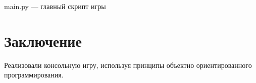 \begin{code}
	\inputminted[breaklines=true, xleftmargin=1em, linenos, frame=single, framesep=10pt, fontsize=\footnotesize, firstline=1, lastline=120]{python}{../src/main.py}
	\caption{main.py --- главный скрипт игры}
\end{code}

\section*{Заключение}
Реализовали консольную игру, используя принципы объектно ориентированного программирования.
